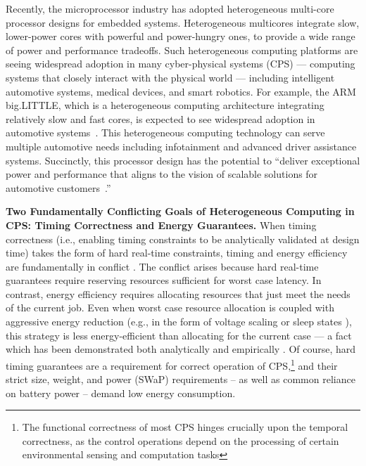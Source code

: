 
Recently, the microprocessor industry has adopted heterogeneous
multi-core processor designs for embedded systems. Heterogeneous
multicores integrate slow, lower-power cores with powerful and
power-hungry ones, to provide a wide range of power and performance
tradeoffs. Such heterogeneous computing platforms are seeing
widespread adoption in many cyber-physical systems (CPS) --- computing
systems that closely interact with the physical world --- including
intelligent automotive systems, medical devices, and smart robotics.
For example, the ARM big.LITTLE, which is a heterogeneous computing
architecture integrating relatively slow and fast cores, is expected
to see widespread adoption in automotive systems~\cite{armvehicle,
  armvehicle1, armvehicle2, armvehicle3}. This heterogeneous computing
technology can serve multiple automotive needs including infotainment
and advanced driver assistance systems. Succinctly, this processor
design has the potential to ``deliver exceptional power and
performance that aligns to the vision of scalable solutions for
automotive customers~\cite{armvehicle}.''

\vspace{2mm} \noindent \textbf{Two Fundamentally Conflicting Goals of
  Heterogeneous Computing in CPS: Timing Correctness and Energy
  Guarantees.} When timing correctness (i.e., enabling timing
constraints to be analytically validated at design time) takes the
form of hard real-time constraints, timing and energy efficiency are
fundamentally in conflict \cite{conflict-book}. The conflict arises
because hard real-time guarantees require reserving resources
sufficient for worst case latency.  In contrast, energy efficiency
requires allocating resources that just meet the needs of the current
job.  Even when worst case resource allocation is coupled with
aggressive energy reduction (e.g., in the form of voltage scaling
\cite{Dudani2002} or sleep states \cite{Huang2009}), this strategy is
less energy-efficient than allocating for the current case --- a fact
which has been demonstrated both analytically
\cite{Albers2011,Bansal2011,Irani} and empirically
\cite{LeSueur11,HotPower,Imes2014a,PowerSlope}. Of course, hard timing
guarantees are a requirement for correct operation of
CPS,\footnote{The functional correctness of most CPS hinges crucially
  upon the temporal correctness, as the control operations depend on
  the processing of certain environmental sensing and computation
  tasks} and their strict size, weight, and power (SWaP) requirements
-- as well as common reliance on battery power -- demand low energy
consumption.

